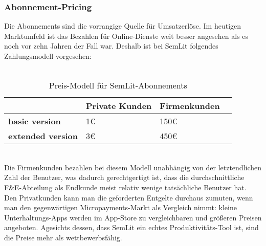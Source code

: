 \subsubsection{Abonnement-Pricing}
Die Abonnements sind die vorrangige Quelle für Umsatzerlöse. Im heutigen Marktumfeld ist das Bezahlen für Online-Dienste weit besser angesehen als es noch vor zehn Jahren der Fall war. Deshalb ist bei SemLit folgendes Zahlungsmodell vorgesehen: 
\\
\\
\begin{table}[h!]
  \centering
    \begin{footnotesize}
  \begin{tabular}{|l|l|l|l|}\hline
  \textbf{ } &  \textbf{Private Kunden} &  \textbf{Firmenkunden} \\ \hline
 \textbf{basic version} & 1\euro{} & 150\euro{} \\ \hline
\textbf{extended version} & 3\euro{} & 450\euro{} \\ \hline
  \end{tabular} 
    \end{footnotesize}
  \caption{Preis-Modell für SemLit-Abonnements}
  \label{tab:break-even}
\end{table} 
\\
Die Firmenkunden bezahlen bei diesem Modell unabhängig von der letztendlichen Zahl der Benutzer, was dadurch gerechtgertigt ist, dass die durchschnittliche F\&E-Abteilung als Endkunde meist relativ wenige tatsächliche Benutzer hat.\\
Den Privatkunden kann man die geforderten Entgelte durchaus zumuten, wenn man den gegenwärtigen Micropayments-Markt als Vergleich nimmt: kleine Unterhaltungs-Apps werden im App-Store zu vergleichbaren und größeren Preisen angeboten. Agesichts dessen, dass SemLit ein echtes Produktivitäts-Tool ist, sind die Preise mehr als wettbewerbsfähig. 


